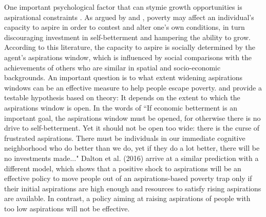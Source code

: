 \documentclass[11.5pt]{article}
\begin{document}
One important psychological factor that can stymie growth opportunities is aspirational constraints \citep{Ray2006, Genicot2017, Dalton2016, Bogliacino2014, Lybbert2018}. As argued by \citet{Appadurai2004} and \citet{Ray2006}, poverty may affect an individual's capacity to aspire in order to contest and alter one's own conditions, in turn discouraging investment in self-betterment and hampering the ability to grow. According to this literature, the capacity to aspire is socially determined by the agent's aspirations window, which is influenced by social comparisons with the achievements of others who are similar in spatial and socio-economic backgrounds. An important question is to what extent widening aspirations windows can be an effective measure to help people escape poverty. \citet{Ray2006} and \citet{Genicot2017} provide a testable hypothesis based on theory: It depends on the extent to which the aspirations window is open. In the words of \citet[][p.4]{Ray2003} ``If economic betterment is an important goal, the aspirations window must be opened, for otherwise there is no drive to self-betterment. Yet it should not be open too wide: there is the curse of frustrated aspirations. There must be individuals in our immediate cognitive neighborhood who do better than we do, yet if they do a lot better, there will be no investments made..."  Dalton et al. (2016) arrive at a similar prediction with a different model, which shows that a positive shock to aspirations will be an effective policy to move people out of an aspirations-based poverty trap only if their initial aspirations are high enough and resources to satisfy rising aspirations are available. In contrast, a policy aiming at raising aspirations of people with too low aspirations will not be effective.

\end{document}
